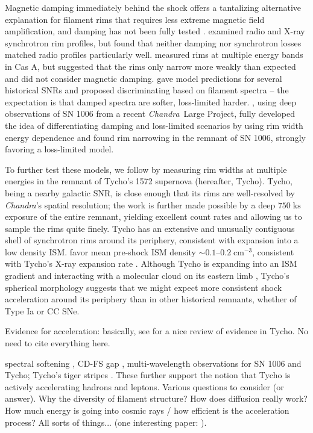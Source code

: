 \documentclass[iop, apj, numberedappendix, twocolappendix]{emulateapj}
\newcommand*{\mt}{\mathrm}
\newcommand*{\unit}[1]{\;\mt{#1}}  %
\newcommand*{\abt}{\mathord{\sim}} %
\newcommand*{\Chandra}{\textit{Chandra}\ }
\begin{document}
Magnetic damping immediately behind the shock offers a tantalizing alternative
explanation for filament rims that requires less extreme magnetic field
amplification, and damping has not been fully tested \citep{pohl2005,
marcowith2010}.  \citet{cassam-chenai2007} examined radio and X-ray synchrotron
rim profiles, but found that neither damping nor synchrotron losses matched
radio profiles particularly well.  \citet{araya2010} measured rims at multiple
energy bands in Cas A, but suggested that the rims only narrow more weakly than
expected and did not consider magnetic damping.  \citet{rettig2012} gave model
predictions for several historical SNRs and proposed discriminating based on
filament spectra -- the expectation is that damped spectra are softer,
loss-limited harder.  \citet{ressler2014}, using deep observations of SN 1006
from a recent \Chandra Large Project, fully developed the idea of
differentiating damping and loss-limited scenarios by using rim width energy
dependence and found rim narrowing in the remnant of SN 1006, strongly favoring
a loss-limited model.

To further test these models, we follow \citet{ressler2014} by measuring rim
widths at multiple energies in the remnant of Tycho's 1572 supernova
(hereafter, Tycho).  Tycho, being a nearby galactic SNR, is close enough that
its rims are well-resolved by \textit{Chandra}'s spatial resolution; the work
is further made possible by a deep $750 \unit{ks}$ exposure of the entire
remnant, yielding excellent count rates and allowing us to sample the rims
quite finely.  Tycho has an extensive and unusually contiguous shell of
synchrotron rims around its periphery, consistent with expansion into a low
density ISM.  \citet{williams2013} favor mean pre-shock ISM density $\abt
0.1$--$0.2 \unit{cm^{-3}}$, consistent with Tycho's X-ray expansion rate
\citep{katsuda2010}.  Although Tycho is expanding into an ISM gradient
\citep{williams2013} and interacting with a molecular cloud on its eastern limb
\citep{reynoso1999}, Tycho's spherical morphology suggests that we might expect
more consistent shock acceleration around its periphery than in other
historical remnants, whether of Type Ia or CC SNe.

Evidence for acceleration: basically, see \citet{morlino2012} for a nice review
of evidence in Tycho.  No need to cite everything here.

spectral softening \citep{cassam-chenai2007}, CD-FS gap \citep{warren2005},
multi-wavelength observations \citep{acero2010, acciari2011, morlino2012} for
SN 1006 and Tycho; Tycho's tiger stripes \citep{eriksen2011}. These further
support the notion that Tycho is actively accelerating hadrons and leptons.
Various questions to consider (or answer).  Why the diversity of filament
structure? How does diffusion really work?  How much energy is going into
cosmic rays / how efficient is the acceleration process?  All sorts of
things... (one interesting paper: \citet{caprioli2013}).
\end{document}
